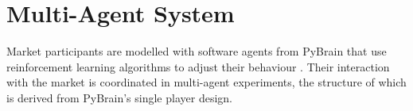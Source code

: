 %

\newpage
\section{Multi-Agent System}
\label{sec:mas}
Market participants are modelled with software agents from PyBrain that use
reinforcement learning algorithms to adjust their behaviour \cite{schaul:2010}.
Their interaction with the market is coordinated in multi-agent experiments,
the structure of which is derived from PyBrain's single player design.

